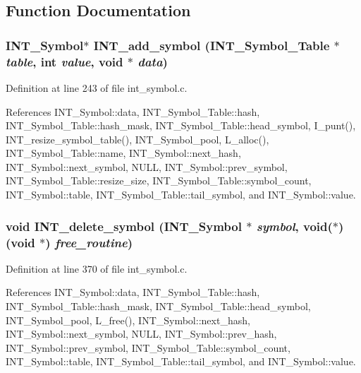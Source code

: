 \subsection{Function Documentation}
\subsubsection{\setlength{\rightskip}{0pt plus 5cm}\bf{INT\_\-Symbol}$\ast$ INT\_\-add\_\-symbol (\bf{INT\_\-Symbol\_\-Table} $\ast$ {\em table}, int {\em value}, void $\ast$ {\em data})}\label{int__symbol_8c_ddfe548700f0b7b030b45cb5fe1cdf67}




Definition at line 243 of file int\_\-symbol.c.

References INT\_\-Symbol::data, INT\_\-Symbol\_\-Table::hash, INT\_\-Symbol\_\-Table::hash\_\-mask, INT\_\-Symbol\_\-Table::head\_\-symbol, I\_\-punt(), INT\_\-resize\_\-symbol\_\-table(), INT\_\-Symbol\_\-pool, L\_\-alloc(), INT\_\-Symbol\_\-Table::name, INT\_\-Symbol::next\_\-hash, INT\_\-Symbol::next\_\-symbol, NULL, INT\_\-Symbol::prev\_\-symbol, INT\_\-Symbol\_\-Table::resize\_\-size, INT\_\-Symbol\_\-Table::symbol\_\-count, INT\_\-Symbol::table, INT\_\-Symbol\_\-Table::tail\_\-symbol, and INT\_\-Symbol::value.
\subsubsection{\setlength{\rightskip}{0pt plus 5cm}void INT\_\-delete\_\-symbol (\bf{INT\_\-Symbol} $\ast$ {\em symbol}, void($\ast$)(void $\ast$) {\em free\_\-routine})}\label{int__symbol_8c_84cc47e8a94e9d12339fe6824c406c6e}




Definition at line 370 of file int\_\-symbol.c.

References INT\_\-Symbol::data, INT\_\-Symbol\_\-Table::hash, INT\_\-Symbol\_\-Table::hash\_\-mask, INT\_\-Symbol\_\-Table::head\_\-symbol, INT\_\-Symbol\_\-pool, L\_\-free(), INT\_\-Symbol::next\_\-hash, INT\_\-Symbol::next\_\-symbol, NULL, INT\_\-Symbol::prev\_\-hash, INT\_\-Symbol::prev\_\-symbol, INT\_\-Symbol\_\-Table::symbol\_\-count, INT\_\-Symbol::table, INT\_\-Symbol\_\-Table::tail\_\-symbol, and INT\_\-Symbol::value.

